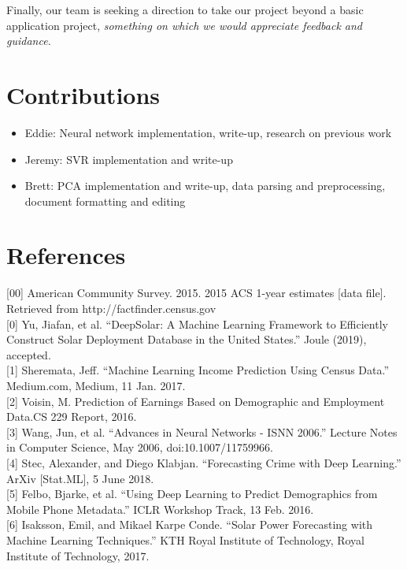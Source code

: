 \documentclass{article}
\begin{document}
	Finally, our team is seeking a direction to take our project beyond a basic application project, \textit{something on which we would appreciate feedback and guidance.}
	
	\section*{Contributions}
		\begin{itemize}[noitemsep,nolistsep]
			\item Eddie: Neural network implementation, write-up, research on previous work
			\item Jeremy: SVR implementation and write-up
			\item Brett: PCA implementation and write-up, data parsing and preprocessing, document formatting and editing
		\end{itemize}
	
	\section*{References}
	\smallskip
	\scriptsize
	\setlength{\parindent}{0in}
	[00] American Community Survey. 2015.  2015 ACS 1-year estimates [data file]. Retrieved from http://factfinder.census.gov\\ [0.5pt]
	
	[0] Yu, Jiafan, et al. “DeepSolar: A Machine Learning Framework to Efficiently Construct Solar Deployment Database in the United States.” Joule (2019), accepted.\\ [0.5pt]
	
	[1] Sheremata, Jeff. “Machine Learning Income Prediction Using Census Data.” Medium.com, Medium, 11 Jan. 2017.\\ [0.5pt]
	
	[2] Voisin, M. Prediction of Earnings Based on Demographic and Employment Data.CS 229 Report, 2016.\\ [0.5pt]
	
	[3] Wang, Jun, et al. “Advances in Neural Networks - ISNN 2006.” Lecture Notes in Computer Science, May 2006, doi:10.1007/11759966.\\ [0.5pt]
	
	[4] Stec, Alexander, and Diego Klabjan. “Forecasting Crime with Deep Learning.” ArXiv [Stat.ML], 5 June 2018.\\ [0.5pt]
	
	[5] Felbo, Bjarke, et al. “Using Deep Learning to Predict Demographics from Mobile Phone Metadata.” ICLR Workshop Track, 13 Feb. 2016.\\ [0.5pt]
	
	[6] Isaksson, Emil, and Mikael Karpe Conde. “Solar Power Forecasting with Machine Learning Techniques.” KTH Royal Institute of Technology, Royal Institute of Technology, 2017.\\ [0.5pt]
\end{document}
